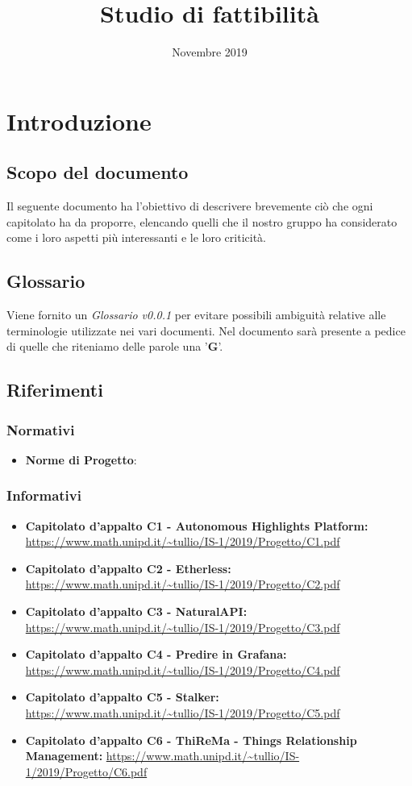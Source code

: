 \documentclass{article}
\title{Studio di fattibilità}
\author{}
\date{Novembre 2019}
\begin{document}
\maketitle

\section{Introduzione}
\subsection{Scopo del documento}
Il seguente documento ha l'obiettivo di descrivere brevemente ciò che ogni capitolato ha da proporre, elencando quelli che il nostro gruppo ha considerato come i loro aspetti più interessanti e le loro criticità. 

\subsection{Glossario}
Viene fornito un \textit{Glossario v0.0.1} per evitare possibili ambiguità relative alle terminologie utilizzate nei vari documenti. Nel documento sarà presente a pedice di quelle che riteniamo delle parole una '\textbf{G}'.   
\subsection{Riferimenti}
    \subsubsection{Normativi}
    \begin{itemize}
      \item \textbf{Norme di Progetto}: 
    \end{itemize}
    \subsubsection{Informativi}
    \begin{itemize}
      \item \textbf{Capitolato d'appalto C1 - Autonomous Highlights Platform:} \url{https://www.math.unipd.it/~tullio/IS-1/2019/Progetto/C1.pdf}
      \item \textbf{Capitolato d'appalto C2 - Etherless:} \url{https://www.math.unipd.it/~tullio/IS-1/2019/Progetto/C2.pdf}
      \item \textbf{Capitolato d'appalto C3 - NaturalAPI:} \url{https://www.math.unipd.it/~tullio/IS-1/2019/Progetto/C3.pdf}
      \item \textbf{Capitolato d'appalto C4 - Predire in Grafana:} \url{https://www.math.unipd.it/~tullio/IS-1/2019/Progetto/C4.pdf}
      \item \textbf{Capitolato d'appalto C5 - Stalker:} \url{https://www.math.unipd.it/~tullio/IS-1/2019/Progetto/C5.pdf}
      \item \textbf{Capitolato d'appalto C6 - ThiReMa - Things Relationship Management:} \url{https://www.math.unipd.it/~tullio/IS-1/2019/Progetto/C6.pdf}
    \end{itemize}
\end{document}
